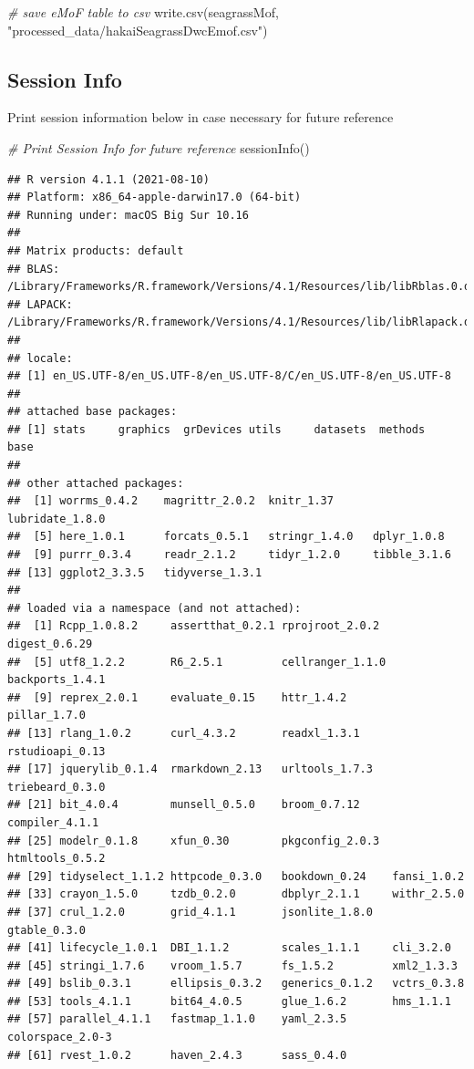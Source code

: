 \documentclass[
]{book}
\newenvironment{Shaded}{\begin{snugshade}}{\end{snugshade}}
\newcommand{\CommentTok}[1]{\textcolor[rgb]{0.56,0.35,0.01}{\textit{#1}}}
\newcommand{\FunctionTok}[1]{\textcolor[rgb]{0.00,0.00,0.00}{#1}}
\newcommand{\NormalTok}[1]{#1}
\newcommand{\StringTok}[1]{\textcolor[rgb]{0.31,0.60,0.02}{#1}}
\begin{document}
\begin{Shaded}
\begin{Highlighting}[]
\CommentTok{\# save eMoF table to csv}
\FunctionTok{write.csv}\NormalTok{(seagrassMof, }\StringTok{"processed\_data/hakaiSeagrassDwcEmof.csv"}\NormalTok{)}
\end{Highlighting}
\end{Shaded}

\hypertarget{session-info}{%
\subsection{Session Info}\label{session-info}}

Print session information below in case necessary for future reference

\begin{Shaded}
\begin{Highlighting}[]
\CommentTok{\# Print Session Info for future reference}
\FunctionTok{sessionInfo}\NormalTok{()}
\end{Highlighting}
\end{Shaded}

\begin{verbatim}
## R version 4.1.1 (2021-08-10)
## Platform: x86_64-apple-darwin17.0 (64-bit)
## Running under: macOS Big Sur 10.16
## 
## Matrix products: default
## BLAS:   /Library/Frameworks/R.framework/Versions/4.1/Resources/lib/libRblas.0.dylib
## LAPACK: /Library/Frameworks/R.framework/Versions/4.1/Resources/lib/libRlapack.dylib
## 
## locale:
## [1] en_US.UTF-8/en_US.UTF-8/en_US.UTF-8/C/en_US.UTF-8/en_US.UTF-8
## 
## attached base packages:
## [1] stats     graphics  grDevices utils     datasets  methods   base     
## 
## other attached packages:
##  [1] worrms_0.4.2    magrittr_2.0.2  knitr_1.37      lubridate_1.8.0
##  [5] here_1.0.1      forcats_0.5.1   stringr_1.4.0   dplyr_1.0.8    
##  [9] purrr_0.3.4     readr_2.1.2     tidyr_1.2.0     tibble_3.1.6   
## [13] ggplot2_3.3.5   tidyverse_1.3.1
## 
## loaded via a namespace (and not attached):
##  [1] Rcpp_1.0.8.2     assertthat_0.2.1 rprojroot_2.0.2  digest_0.6.29   
##  [5] utf8_1.2.2       R6_2.5.1         cellranger_1.1.0 backports_1.4.1 
##  [9] reprex_2.0.1     evaluate_0.15    httr_1.4.2       pillar_1.7.0    
## [13] rlang_1.0.2      curl_4.3.2       readxl_1.3.1     rstudioapi_0.13 
## [17] jquerylib_0.1.4  rmarkdown_2.13   urltools_1.7.3   triebeard_0.3.0 
## [21] bit_4.0.4        munsell_0.5.0    broom_0.7.12     compiler_4.1.1  
## [25] modelr_0.1.8     xfun_0.30        pkgconfig_2.0.3  htmltools_0.5.2 
## [29] tidyselect_1.1.2 httpcode_0.3.0   bookdown_0.24    fansi_1.0.2     
## [33] crayon_1.5.0     tzdb_0.2.0       dbplyr_2.1.1     withr_2.5.0     
## [37] crul_1.2.0       grid_4.1.1       jsonlite_1.8.0   gtable_0.3.0    
## [41] lifecycle_1.0.1  DBI_1.1.2        scales_1.1.1     cli_3.2.0       
## [45] stringi_1.7.6    vroom_1.5.7      fs_1.5.2         xml2_1.3.3      
## [49] bslib_0.3.1      ellipsis_0.3.2   generics_0.1.2   vctrs_0.3.8     
## [53] tools_4.1.1      bit64_4.0.5      glue_1.6.2       hms_1.1.1       
## [57] parallel_4.1.1   fastmap_1.1.0    yaml_2.3.5       colorspace_2.0-3
## [61] rvest_1.0.2      haven_2.4.3      sass_0.4.0
\end{verbatim}
\end{document}
